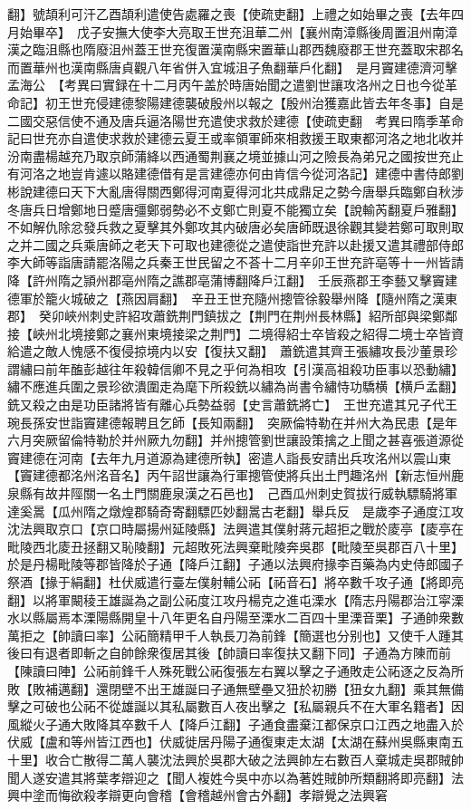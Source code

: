 翻】號頡利可汗乙酉頡利遣使告處羅之喪【使疏吏翻】上禮之如始畢之喪【去年四月始畢卒】　戊子安撫大使李大亮取王世充沮華二州【襄州南漳縣後周置沮州南漳漢之臨沮縣也隋廢沮州蓋王世充復置漢南縣宋置華山郡西魏廢郡王世充蓋取宋郡名而置華州也漢南縣唐貞觀八年省併入宜城沮子魚翻華戶化翻】　是月竇建德濟河擊孟海公　【考異曰實録在十二月丙午盖於時唐始聞之遣劉世讓攻洛州之日也今從革命記】初王世充侵建德黎陽建德襲破殷州以報之【殷州治獲嘉此皆去年冬事】自是二國交惡信使不通及唐兵逼洛陽世充遣使求救於建德【使疏吏翻　考異曰隋季革命記曰世充亦自遣使求救於建德云夏王或率領軍師來相救援王取東都河洛之地北收并汾南盡楊越充乃取京師蒲絳以西通蜀荆襄之境並據山河之險長為弟兄之國按世充止有河洛之地豈肯遽以賂建德借有是言建德亦何由肯信今從河洛記】建德中書侍郎劉彬說建德曰天下大亂唐得關西鄭得河南夏得河北共成鼎足之勢今唐舉兵臨鄭自秋涉冬唐兵日增鄭地日蹙唐彊鄭弱勢必不攴鄭亡則夏不能獨立矣【說輸芮翻夏戶雅翻】不如解仇除忿發兵救之夏擊其外鄭攻其内破唐必矣唐師既退徐觀其變若鄭可取則取之并二國之兵乘唐師之老天下可取也建德從之遣使詣世充許以赴援又遣其禮部侍郎李大師等詣唐請罷洛陽之兵秦王世民留之不荅十二月辛卯王世充許亳等十一州皆請降【許州隋之頴州郡亳州隋之譙郡亳蒲博翻降戶江翻】　壬辰燕郡王李藝又擊竇建德軍於籠火城破之【燕因肩翻】　辛丑王世充隨州摠管徐毅舉州降【隨州隋之漢東郡】　癸卯峽州刺史許紹攻蕭銑荆門鎮拔之【荆門在荆州長林縣】紹所部與梁鄭鄰接【峽州北境接鄭之襄州東境接梁之荆門】二境得紹士卒皆殺之紹得二境士卒皆資給遣之敵人愧感不復侵掠境内以安【復扶又翻】　蕭銑遣其齊王張繡攻長沙董景珍謂繡曰前年醢彭越往年殺韓信卿不見之乎何為相攻【引漢高祖殺功臣事以恐動繡】繡不應進兵圍之景珍欲潰圍走為麾下所殺銑以繡為尚書令繡恃功驕横【横戶孟翻】銑又殺之由是功臣諸將皆有離心兵勢益弱【史言蕭銑將亡】　王世充遣其兄子代王琬長孫安世詣竇建德報聘且乞師【長知兩翻】　突厥倫特勒在并州大為民患【是年六月突厥留倫特勒於并州厥九勿翻】并州摠管劉世讓設策擒之上聞之甚喜張道源從竇建德在河南【去年九月道源為建德所執】密遣人詣長安請出兵攻洺州以震山東【竇建德都洺州洺音名】丙午詔世讓為行軍摠管使將兵出土門趣洺州【新志恒州鹿泉縣有故井陘關一名土門關鹿泉漢之石邑也】　己酉瓜州刺史賀拔行威執驃騎將軍達奚暠【瓜州隋之燉煌郡騎奇寄翻驃匹妙翻暠古老翻】舉兵反　是歲李子通度江攻沈法興取京口【京口時屬揚州延陵縣】法興遣其僕射蔣元超拒之戰於庱亭【庱亭在毗陵西北庱丑拯翻又恥陵翻】元超敗死法興棄毗陵奔吳郡【毗陵至吳郡百八十里】於是丹楊毗陵等郡皆降於子通【降戶江翻】子通以法興府掾李百藥為内史侍郎國子祭酒【掾于絹翻】杜伏威遣行臺左僕射輔公祏【祏音石】將卒數千攻子通【將即亮翻】以將軍闞稜王雄誕為之副公祏度江攻丹楊克之進屯溧水【隋志丹陽郡治江寜溧水以縣屬焉本溧陽縣開皇十八年更名自丹陽至溧水二百四十里溧音栗】子通帥衆數萬拒之【帥讀曰率】公祏簡精甲千人執長刀為前鋒【簡選也分别也】又使千人踵其後曰有退者即斬之自帥餘衆復居其後【帥讀曰率復扶又翻下同】子通為方陳而前【陳讀曰陣】公祏前鋒千人殊死戰公祏復張左右翼以擊之子通敗走公祏逐之反為所敗【敗補邁翻】還閉壁不出王雄誕曰子通無壁壘又狃於初勝【狃女九翻】乘其無備擊之可破也公祏不從雄誕以其私屬數百人夜出擊之【私屬親兵不在大軍名籍者】因風縱火子通大敗降其卒數千人【降戶江翻】子通食盡棄江都保京口江西之地盡入於伏威【盧和等州皆江西也】伏威徙居丹陽子通復東走太湖【太湖在蘇州吳縣東南五十里】收合亡散得二萬人襲沈法興於吳郡大破之法興帥左右數百人棄城走吳郡賊帥聞人遂安遣其將葉孝辯迎之【聞人複姓今吳中亦以為著姓賊帥所類翻將即亮翻】法興中塗而悔欲殺孝辯更向會稽【會稽越州會古外翻】孝辯覺之法興窘